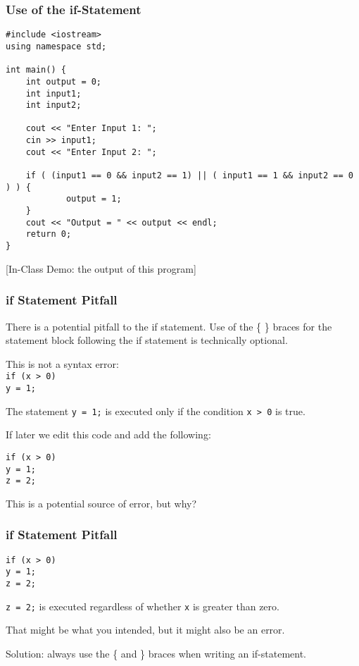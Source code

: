 \begin{frame}[fragile]
\frametitle{Use of the if-Statement}

{\scriptsize
\begin{verbatim}
#include <iostream>
using namespace std;

int main() {
    int output = 0;
    int input1;
    int input2;
    
    cout << "Enter Input 1: ";
    cin >> input1;
    cout << "Enter Input 2: ";
    
    if ( (input1 == 0 && input2 == 1) || ( input1 == 1 && input2 == 0 ) ) {
            output = 1; 
    }
    cout << "Output = " << output << endl;
    return 0;    
}
\end{verbatim}
}

[In-Class Demo: the output of this program]

\end{frame}

\begin{frame}
\frametitle{if Statement Pitfall}
There is a potential pitfall to the if statement. Use of the \{ \} braces for the statement block following the if statement is technically optional.

This is not a syntax error:\\
\texttt{if (x > 0)}\\
\quad\texttt{y = 1;}

The statement \texttt{y = 1;} is executed only if the condition \texttt{x > 0} is true.

If later we edit this code and add the following:

\texttt{if (x > 0)}\\
\quad\texttt{y = 1;}\\
\quad\texttt{z = 2;}

This is a potential source of error, but why?

\end{frame}

\begin{frame}
\frametitle{if Statement Pitfall}

\texttt{if (x > 0)}\\
\quad\texttt{y = 1;}\\
\quad\texttt{z = 2;}

\texttt{z = 2;} is executed regardless of whether \texttt{x} is greater than zero.

That might be what you intended, but it might also be an error.

Solution: always use the \{ and \} braces when writing an if-statement.

\end{frame}

